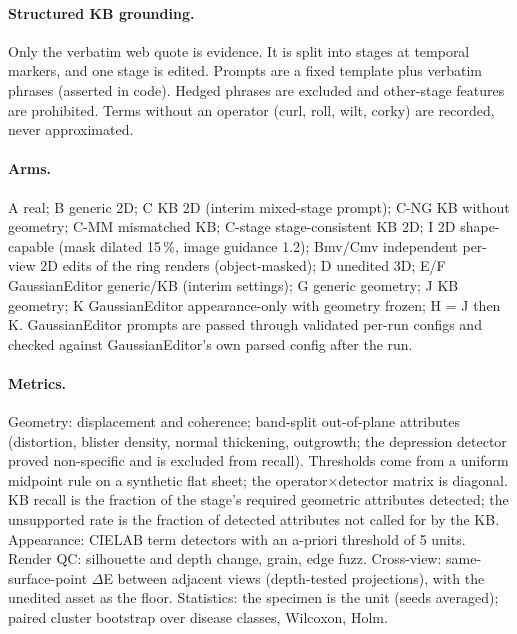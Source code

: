 \paragraph{Structured KB grounding.} Only the verbatim web quote is evidence. It is split into stages at temporal markers, and one stage is edited. Prompts are a fixed template plus verbatim phrases (asserted in code). Hedged phrases are excluded and other-stage features are prohibited. Terms without an operator (curl, roll, wilt, corky) are recorded, never approximated.
\paragraph{Arms.} A real; B generic 2D; C KB 2D (interim mixed-stage prompt); C-NG KB without geometry; C-MM mismatched KB; C-stage stage-consistent KB 2D; I 2D shape-capable (mask dilated 15\,\%, image guidance 1.2); Bmv/Cmv independent per-view 2D edits of the ring renders (object-masked); D unedited 3D; E/F GaussianEditor generic/KB (interim settings); G generic geometry; J KB geometry; K GaussianEditor appearance-only with geometry frozen; H = J then K. GaussianEditor prompts are passed through validated per-run configs and checked against GaussianEditor's own parsed config after the run.
\paragraph{Metrics.} Geometry: displacement and coherence; band-split out-of-plane attributes (distortion, blister density, normal thickening, outgrowth; the depression detector proved non-specific and is excluded from recall). Thresholds come from a uniform midpoint rule on a synthetic flat sheet; the operator$\times$detector matrix is diagonal. KB recall is the fraction of the stage's required geometric attributes detected; the unsupported rate is the fraction of detected attributes not called for by the KB. Appearance: CIELAB term detectors with an a-priori threshold of 5 units. Render QC: silhouette and depth change, grain, edge fuzz. Cross-view: same-surface-point $\Delta$E between adjacent views (depth-tested projections), with the unedited asset as the floor. Statistics: the specimen is the unit (seeds averaged); paired cluster bootstrap over disease classes, Wilcoxon, Holm.
